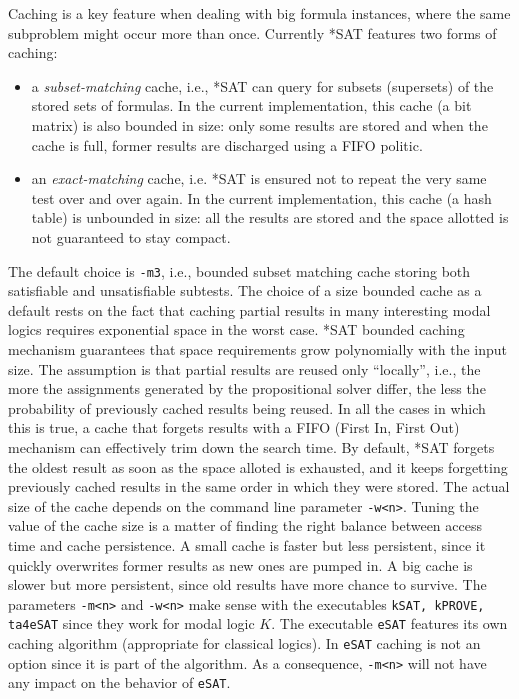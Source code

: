 \documentclass[12pt]{report}
\begin{document}
Caching is a key feature when dealing with big formula instances,
where the same subproblem might occur more than once. Currently *SAT
features two forms of caching:
\begin{itemize}
\item
a \textit{subset-matching} cache, i.e., *SAT can query for subsets
(supersets) of the stored sets of formulas. In the current
implementation, this cache (a bit matrix) is also bounded in
size: only some results are stored and when the cache is full,
former results are discharged using a FIFO politic.
\item
an \textit{exact-matching} cache, i.e. *SAT is ensured not to repeat
the very same test over and over again. In the current implementation,
this cache (a hash table) is unbounded in size: all the results are
stored and the space allotted is not guaranteed to stay compact.
\end{itemize}
The default choice is {\tt -m3}, i.e., bounded subset matching cache
storing both satisfiable and unsatisfiable subtests.
The choice of a size bounded cache as a default
rests on the fact that caching partial results in many interesting
modal logics requires exponential space in the worst case. *SAT
bounded caching mechanism guarantees that space requirements grow polynomially
with the input size. The assumption is that partial results are reused only
``locally'', i.e., the more the assignments generated by the
propositional solver differ, the less the probability of
previously cached results being reused. In all the cases in which
this is true, a cache that forgets results with a FIFO 
(First In, First Out) mechanism can effectively trim down the search
time. By default, *SAT forgets the oldest result as soon as the space
alloted is exhausted, and it keeps forgetting previously cached
results in the same order in which they were stored.
The actual size of the cache
depends on the command line parameter {\tt -w<n>}. Tuning the value of
the cache size is a matter of finding the right balance between access
time and cache persistence. A small cache is faster but less
persistent, since it quickly overwrites former results as new ones
are pumped in. A big cache is slower but more persistent, since old
results have more chance to survive. 
The parameters {\tt -m<n>} and {\tt -w<n>} make sense 
with the executables {\tt kSAT, kPROVE, ta4eSAT} since
they work for modal logic $K$. The
executable {\tt eSAT} features its own caching algorithm
(appropriate for classical logics). In {\tt eSAT} caching is not an
option since it is part of the algorithm. 
As a consequence, {\tt -m<n>} will not
have any impact on the behavior of {\tt eSAT}.
\end{document}
